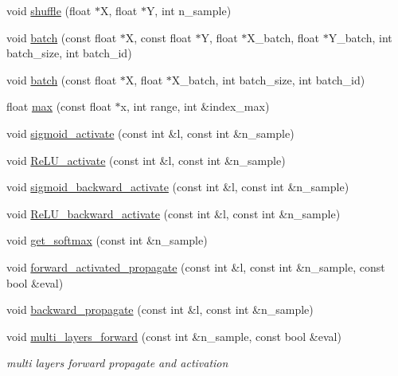 \begin{DoxyCompactItemize}
\item 
void \hyperlink{classdnn_a09a39f5b6f0b29af3ae470a907e3c097}{shuffle} (float $\ast$X, float $\ast$Y, int n\+\_\+sample)
\item 
void \hyperlink{classdnn_afe3252fc51fda18ec793933157bad7b8}{batch} (const float $\ast$X, const float $\ast$Y, float $\ast$X\+\_\+batch, float $\ast$Y\+\_\+batch, int batch\+\_\+size, int batch\+\_\+id)
\item 
void \hyperlink{classdnn_a7e099c8aa579b99170b170f306029c5f}{batch} (const float $\ast$X, float $\ast$X\+\_\+batch, int batch\+\_\+size, int batch\+\_\+id)
\item 
float \hyperlink{classdnn_acb3008f68cd011e0820612c972fae41d}{max} (const float $\ast$x, int range, int \&index\+\_\+max)
\item 
void \hyperlink{classdnn_ac7d070a8383387047777429750d31c2e}{sigmoid\+\_\+activate} (const int \&l, const int \&n\+\_\+sample)
\item 
void \hyperlink{classdnn_abb924e8a0917dd8a43c057d6f750ee2f}{Re\+L\+U\+\_\+activate} (const int \&l, const int \&n\+\_\+sample)
\item 
void \hyperlink{classdnn_ad01dcf32fdb9321ad8396bafb0495f6b}{sigmoid\+\_\+backward\+\_\+activate} (const int \&l, const int \&n\+\_\+sample)
\item 
void \hyperlink{classdnn_a2fe2905bc80e29dd50130bc41485adf4}{Re\+L\+U\+\_\+backward\+\_\+activate} (const int \&l, const int \&n\+\_\+sample)
\item 
void \hyperlink{classdnn_a919bcb8e48259d7a433677bce41b0a64}{get\+\_\+softmax} (const int \&n\+\_\+sample)
\item 
void \hyperlink{classdnn_a0b6f3f64459feb244ffa795c8eef91b3}{forward\+\_\+activated\+\_\+propagate} (const int \&l, const int \&n\+\_\+sample, const bool \&eval)
\item 
void \hyperlink{classdnn_a6d76c251b70fb0423a3fb9c42af32752}{backward\+\_\+propagate} (const int \&l, const int \&n\+\_\+sample)
\item 
\mbox{\label{classdnn_ad618d5da89744e6bc10e217d81d99605}} 
void \hyperlink{classdnn_ad618d5da89744e6bc10e217d81d99605}{multi\+\_\+layers\+\_\+forward} (const int \&n\+\_\+sample, const bool \&eval)
\begin{DoxyCompactList}\small\item\em multi layers forward propagate and activation \end{DoxyCompactList}\item 

\end{DoxyCompactItemize}
